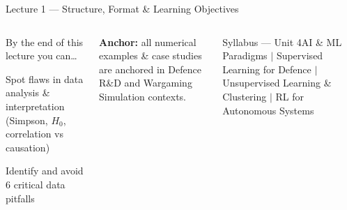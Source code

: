 \documentclass[aspectratio=169,10pt,t]{beamer}
\begin{document}
\begin{frame}{Lecture 1 --- Structure, Format \& Learning Objectives}
\begin{columns}[T]
\begin{cbox}{By the end of this lecture you can\ldots}
\begin{te}
\item Spot flaws in data analysis \& interpretation (Simpson, $H_0$, correlation vs causation)
\item Identify and avoid 6 critical data pitfalls
\end{te}\end{cbox}
\begin{rbox}\scriptsize\textbf{Anchor:} all numerical examples \& case studies are anchored in Defence R\&D and Wargaming Simulation contexts.\end{rbox}
\begin{cbox}[ISSAblue]{Syllabus --- Unit 4}\scriptsize AI \& ML Paradigms $\mid$ Supervised Learning for Defence $\mid$ Unsupervised Learning \& Clustering $\mid$ RL for Autonomous Systems\end{cbox}
\end{columns}
\end{frame}
\end{document}

